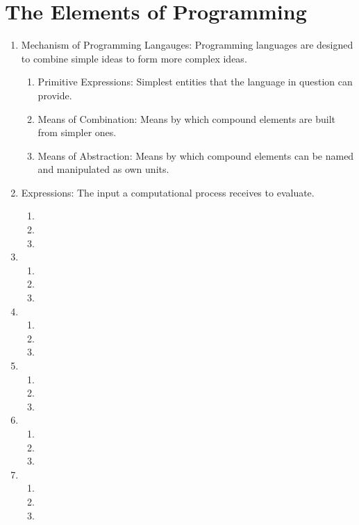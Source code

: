 
\section{The Elements of Programming}

\begin{enumerate}
\item Mechanism of Programming Langauges: Programming
    languages are designed to combine simple ideas to form
    more complex ideas.
    \begin{enumerate}
    \item Primitive Expressions: Simplest entities that the
        language in question can provide.
    \item Means of Combination: Means by which compound
        elements are built from simpler ones.
    \item Means of Abstraction: Means by which compound
        elements can be named and manipulated as own units.
    \end{enumerate}
\item Expressions: The input a computational process
    receives to evaluate.
    \begin{enumerate}
    \item <++>
    \item <++>
    \item <++>
    \end{enumerate}
\item <++>
    \begin{enumerate}
    \item <++>
    \item <++>
    \item <++>
    \end{enumerate}
\item <++>
    \begin{enumerate}
    \item <++>
    \item <++>
    \item <++>
    \end{enumerate}
\item <++>
    \begin{enumerate}
    \item <++>
    \item <++>
    \item <++>
    \end{enumerate}
\item <++>
    \begin{enumerate}
    \item <++>
    \item <++>
    \item <++>
    \end{enumerate}
\item <++>
    \begin{enumerate}
    \item <++>
    \item <++>
    \item <++>
    \end{enumerate}
\end{enumerate}
